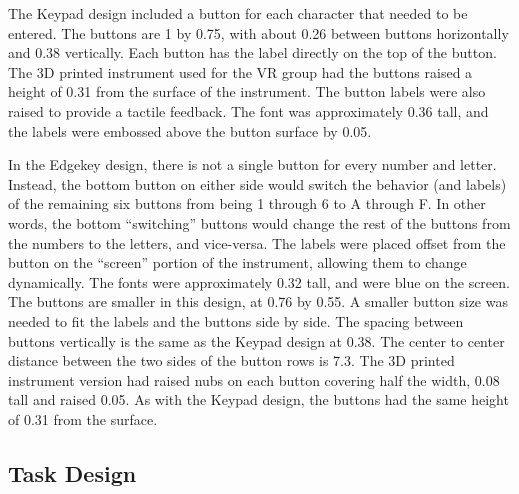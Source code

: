 The Keypad design included a button for each character that needed to be entered.
The buttons are \SI{1}{\inch} by \SI{0.75}{\inch}, with about \SI{0.26}{\inch} between buttons horizontally and \SI{0.38}{\inch} vertically.
Each button has the label directly on the top of the button.
The 3D printed instrument used for the VR group had the buttons raised a height of \SI{0.31}{\inch} from the surface of the instrument.
The button labels were also raised to provide a tactile feedback.
The font was approximately \SI{0.36}{\inch} tall, and the labels were embossed above the button surface by \SI{0.05}{\inch}.

In the Edgekey design, there is not a single button for every number and letter.
Instead, the bottom button on either side would switch the behavior (and labels) of the remaining six buttons from being 1 through 6 to A through F.
In other words, the bottom ``switching'' buttons would change the rest of the buttons from the numbers to the letters, and vice-versa.
The labels were placed offset from the button on the ``screen'' portion of the instrument, allowing them to change dynamically.
The fonts were approximately \SI{0.32}{\inch} tall, and were blue on the screen.
The buttons are smaller in this design, at \SI{0.76}{\inch} by \SI{0.55}{\inch}.
A smaller button size was needed to fit the labels and the buttons side by side.
The spacing between buttons vertically is the same as the Keypad design at \SI{0.38}{\inch}.
The center to center distance between the two sides of the button rows is \SI{7.3}{\inch}.
The 3D printed instrument version had raised nubs on each button covering half the width, \SI{0.08}{\inch} tall and raised \SI{0.05}{\inch}.
As with the Keypad design, the buttons had the same height of \SI{0.31}{\inch} from the surface.

\subsection{Task Design}



%

